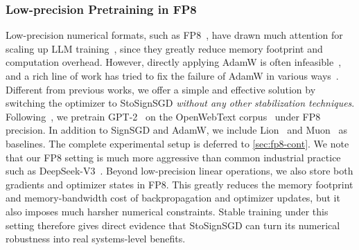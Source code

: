 \documentclass{article}
\begin{document}
\subsubsection{Low-precision Pretraining in FP8\label{sec:fp8}}
Low-precision numerical formats, such as FP8~\citep{micikevicius2022fp8}, have drawn much attention for scaling up LLM training~\citep{liu2024deepseek,yang2025qwen3,ICLR2025fp8scaling}, since they greatly reduce memory footprint and computation overhead. However, directly applying AdamW is often infeasible~\citep{wortsman2023stable,lee2024fp8,qiu2026why}, and a rich line of work has tried to fix the failure of AdamW in various ways~\citep{perez2023training,peng2023fp8,balancca2024scalify,ICLR2025coat}. Different from previous works, we offer a simple and effective solution by switching the optimizer to StoSignSGD \emph{without any other stabilization techniques}. Following~\citet{qiu2026why}, we pretrain GPT-2~\citep{radford2019language} on the OpenWebText corpus~\citep{Gokaslan2019OpenWeb} under FP8 precision. In addition to SignSGD and AdamW, we include Lion~\citep{chen2023symbolic} and Muon~\citep{jordan2024muon,liu2025muon} as baselines. The complete experimental setup is deferred to \cref{sec:fp8-cont}. We note that our FP8 setting is much more aggressive than common industrial practice such as DeepSeek-V3~\citep{liu2024deepseek}. Beyond low-precision linear operations, we also store both gradients and optimizer states in FP8. This greatly reduces the memory footprint and memory-bandwidth cost of backpropagation and optimizer updates, but it also imposes much harsher numerical constraints. Stable training under this setting therefore gives direct evidence that StoSignSGD can turn its numerical robustness into real systems-level benefits.
\begin{table}
    \centering
    \caption{FP8 pretraining results for GPT-2.\label{tab:fp8}}
    \vspace{-8pt}
    \vspace{-8pt} 
\end{table}
\end{document}
